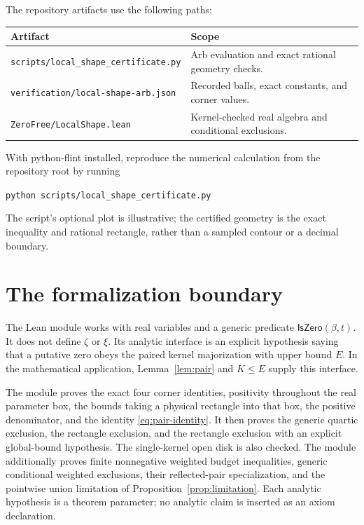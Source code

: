 \documentclass[11pt,a4paper]{article}
\theoremstyle{definition}
\newcommand{\src}[1]{\nolinkurl{#1}}
\begin{document}
The repository artifacts use the following paths:
\begin{center}
\begin{tabular}{>{\raggedright\arraybackslash}p{}>{\raggedright\arraybackslash}p{}}
\toprule
Artifact & Scope\\
\midrule
\src{scripts/local_shape_certificate.py}
 & Arb evaluation and exact rational geometry checks.\\[3pt]
\src{verification/local-shape-arb.json}
 & Recorded balls, exact constants, and corner values.\\[3pt]
\src{ZeroFree/LocalShape.lean}
 & Kernel-checked real algebra and conditional exclusions.\\
\bottomrule
\end{tabular}
\end{center}
With python-flint installed, reproduce the numerical calculation
from the repository root by running
\begin{center}
\texttt{python scripts/local\_shape\_certificate.py}
\end{center}
The script's optional plot is illustrative;
the certified geometry is the exact inequality and rational
rectangle, rather than a sampled contour or a decimal boundary.

\section{The formalization boundary}
\label{sec:formal}

The Lean module works with real variables and a generic predicate
$\mathsf{IsZero}(\beta,t)$. It does not define $\zeta$ or $\xi$.
Its analytic interface is an explicit hypothesis saying that a
putative zero obeys the paired kernel majorization with upper
bound $E$. In the mathematical application, Lemma~\ref{lem:pair}
and $K\le E$ supply this interface.

The module proves the exact four corner identities, positivity
throughout the real parameter box, the bounds taking a physical
rectangle into that box, the positive denominator, and the
identity \eqref{eq:pair-identity}. It then proves the generic
quartic exclusion, the rectangle exclusion, and the rectangle
exclusion with an explicit global-bound hypothesis. The
single-kernel open disk is also checked. The module additionally
proves finite nonnegative weighted budget inequalities, generic
conditional weighted exclusions, their reflected-pair specialization,
and the pointwise union limitation of Proposition~\ref{prop:limitation}.
Each analytic hypothesis
is a theorem parameter; no analytic claim is inserted as an
axiom declaration.
\end{document}

